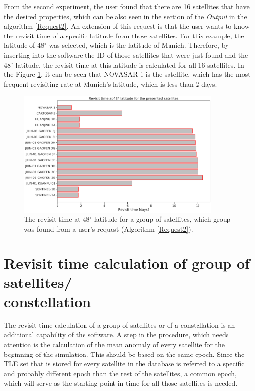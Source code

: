 From the second experiment, the user found that there are 16 satellites that have the desired properties, which can be also seen in the section of the \textit{Output} in the algorithm \ref{Request2}. An extension of this request is that the user wants to know the revisit time of a specific latitude from those satellites. For this example, the latitude of 48$^{\circ}$ was selected, which is the latitude of Munich. Therefore, by inserting into the software the ID of those satellites that were just found and the 48$^{\circ}$ latitude, the revisit time at this latitude is calculated for all 16 satellites. In the Figure \ref{revisit_time_at_latitude_48}, it can be seen that NOVASAR-1 is the satellite, which has the most frequent revisiting rate at Munich's latitude, which is less than 2 days.

\begin{figure}
\centering
\includegraphics[width=0.9\textwidth]{Images/revisit_time_at_latitude_48.png}
\caption{The revisit time at 48$^{\circ}$ latitude for a group of satellites, which group was found from a user's request (Algorithm \ref{Request2}).}
\label{revisit_time_at_latitude_48}
\end{figure}

\bigskip
\section{Revisit time calculation of group of satellites/ \\constellation}
\bigskip

The revisit time calculation of a group of satellites or of a constellation is an additional capability of the software. A step in the procedure, which needs attention is the calculation of the mean anomaly of every satellite for the beginning of the simulation. This should be based on the same epoch. Since the TLE set that is stored for every satellite in the database is referred to a specific and probably different epoch than the rest of the satellites, a common epoch, which will serve as the starting point in time for all those satellites is needed.

